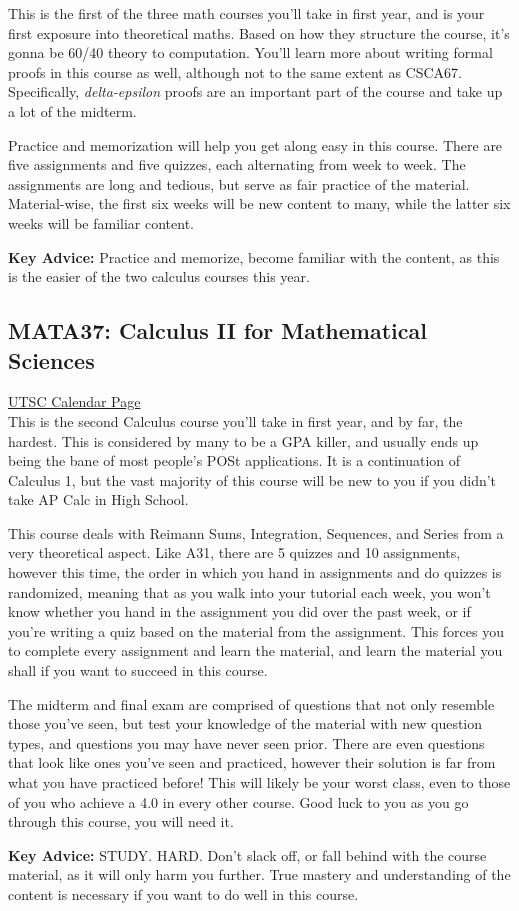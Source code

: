 \documentclass[11pt]{article}
\begin{document}
This is the first of the three math courses you'll take in first year, and is your first exposure into theoretical maths.  Based on how they structure the course, it's gonna be 60/40 theory to computation.  You'll learn more about writing formal proofs in this course as well, although not to the same extent as CSCA67. Specifically, \textit{delta-epsilon} proofs are an important part of the course and take up a lot of the midterm.\par
Practice and memorization will help you get along easy in this course.  There are five assignments and five quizzes, each alternating from week to week.  The assignments are long and tedious, but serve as fair practice of the material.  Material-wise, the first six weeks will be new content to many, while the latter six weeks will be familiar content.\par
\textbf{Key Advice:} Practice and memorize, become familiar with the content, as this is the easier of the two calculus courses this year.

\subsection{MATA37: Calculus II for Mathematical Sciences}

\href{https://utsc.calendar.utoronto.ca/course/MATA37H3}{UTSC Calendar Page}\\

This is the second Calculus course you'll take in first year, and by far, the hardest.  This is considered by many to be a GPA killer, and usually ends up being the bane of most people's POSt applications. It is a continuation of Calculus 1, but the vast majority of this course will be new to you if you didn't take AP Calc in High School.\par
This course deals with Reimann Sums, Integration, Sequences, and Series from a very theoretical aspect.  Like A31, there are 5 quizzes and 10 assignments, however this time, the order in which you hand in assignments and do quizzes is randomized, meaning that as you walk into your tutorial each week, you won't know whether you hand in the assignment you did over the past week, or if you're writing a quiz based on the material from the assignment.  This forces you to complete every assignment and learn the material, and learn the material you shall if you want to succeed in this course. \par
The midterm and final exam are comprised of questions that not only resemble those you've seen, but test your knowledge of the material with new question types, and questions you may have never seen prior. There are even questions that look like ones you've seen and practiced, however their solution is far from what you have practiced before! This will likely be your worst class, even to those of you who achieve a 4.0 in every other course. Good luck to you as you go through this course, you will need it.\par
\textbf{Key Advice:} STUDY. HARD. Don't slack off, or fall behind with the course material, as it will only harm you further.  True mastery and understanding of the content is necessary if you want to do well in this course.
\end{document}
